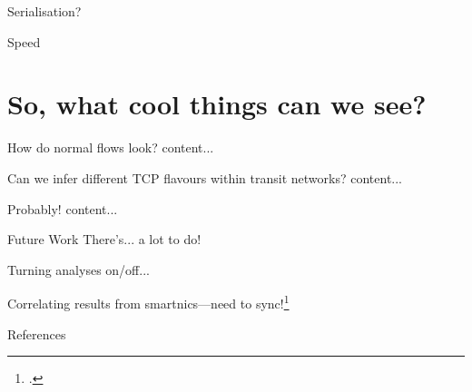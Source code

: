 \documentclass[aspectratio=169,xcolor={dvipsnames}
,hide notes
]{beamer}
\begin{document}
\begin{frame}{Serialisation?}
	
\end{frame}

\begin{frame}{Speed}
	
\end{frame}

\section{So, what cool things can we see?}

\begin{frame}{How do normal flows look?}
	content...
\end{frame}

\begin{frame}{Can we infer different TCP flavours within transit networks?}
	content...
\end{frame}

\begin{frame}{Probably!}
	content...
\end{frame}

\begin{frame}{Future Work}
	There's... a lot to do!
	
	Turning analyses on/off...
	
	Correlating results from smartnics---need to sync!\footcite{DBLP:conf/sosr/KannanJC19}
	
	
\end{frame}

\appendix

\begin{frame}[allowframebreaks]{References}
	\printbibliography[heading=none]
\end{frame}
\end{document}
